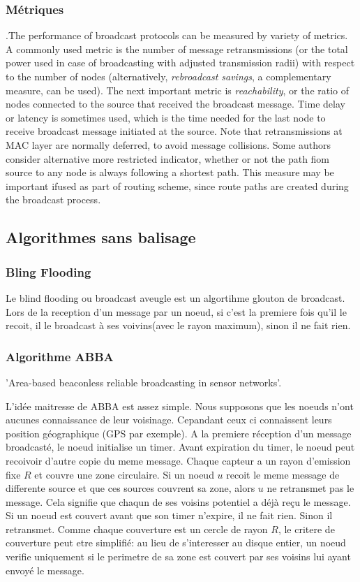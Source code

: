 \subsubsection{Métriques}.The performance of broadcast protocols can be measured by variety of metrics. A commonly used metric is the number of message retransmissions (or the total power used in case of broadcasting with adjusted 
transmission
 radii) with respect to the number of nodes (alternatively, {\it rebroadcast savings}, a complementary measure, can be used). The next important metric is {\it reachability}, or the ratio of nodes connected to the source
 that received the broadcast message. Time delay or latency is sometimes used, which is the time needed for the last node to receive broadcast message initiated at the source. Note that retransmissions at MAC layer are 
normally deferred, to avoid message collisions. Some authors consider alternative more restricted indicator, whether or not the path fiom source to any node is always following a shortest path. This measure may be important
 ifused as part of routing scheme, since route paths are created during the broadcast process.



\subsection{Algorithmes sans balisage}
\subsubsection{Bling Flooding}
Le blind flooding ou broadcast aveugle est un algortihme glouton de broadcast. Lors de la reception d'un message par un noeud, si c'est la premiere fois qu'il le recoit, il le broadcast à ses voivins(avec le rayon maximum), sinon il
 ne fait rien.
\subsubsection{Algorithme ABBA}
'Area-based beaconless reliable broadcasting in
sensor networks'\cite{ABBA06}.

L'idée maitresse de ABBA est assez simple. Nous supposons que les noeuds n'ont aucunes connaissance de leur voisinage. Cepandant ceux ci connaissent leurs position géographique (GPS par exemple).
A la premiere réception d'un message broadcasté, le noeud initialise un timer. Avant expiration du timer, le noeud peut recoivoir d'autre copie du meme message. Chaque capteur a un rayon d'emission fixe $R$
et couvre une zone circulaire. Si un noeud $u$ recoit le meme message de differente source et que ces sources couvrent sa zone, alors $u$ ne retransmet pas le message.
Cela signifie que chaqun de ses voisins potentiel a déjà reçu le message. Si un noeud est couvert avant que son timer n'expire, il ne fait rien. Sinon il retransmet.
Comme chaque couverture est un cercle de rayon $R$, le critere de couverture peut etre simplifié: au lieu de s'interesser au disque entier, un noeud verifie uniquement si le perimetre de sa zone est couvert par 
ses voisins lui ayant envoyé le message. 



